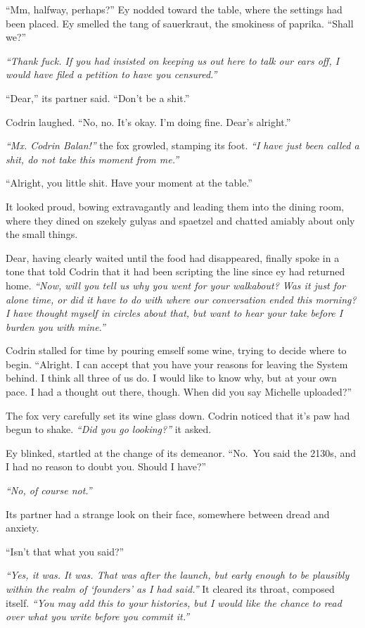 ``Mm, halfway, perhaps?'' Ey nodded toward the table, where the settings had been placed. Ey smelled the tang of sauerkraut, the smokiness of paprika. ``Shall we?''

\emph{``Thank fuck. If you had insisted on keeping us out here to talk our ears off, I would have filed a petition to have you censured.''}

``Dear,'' its partner said. ``Don't be a shit.''

Codrin laughed. ``No, no. It's okay. I'm doing fine. Dear's alright.''

\emph{``Mx. Codrin Balan!''} the fox growled, stamping its foot. \emph{``I have just been called a shit, do not take this moment from me.''}

``Alright, you little shit. Have your moment at the table.''

It looked proud, bowing extravagantly and leading them into the dining room, where they dined on szekely gulyas and spaetzel and chatted amiably about only the small things.

Dear, having clearly waited until the food had disappeared, finally spoke in a tone that told Codrin that it had been scripting the line since ey had returned home. \emph{``Now, will you tell us why you went for your walkabout? Was it just for alone time, or did it have to do with where our conversation ended this morning? I have thought myself in circles about that, but want to hear your take before I burden you with mine.''}

Codrin stalled for time by pouring emself some wine, trying to decide where to begin. ``Alright. I can accept that you have your reasons for leaving the System behind. I think all three of us do. I would like to know why, but at your own pace. I had a thought out there, though. When did you say Michelle uploaded?''

The fox very carefully set its wine glass down. Codrin noticed that it's paw had begun to shake. \emph{``Did you go looking?''} it asked.

Ey blinked, startled at the change of its demeanor. ``No.~You said the 2130s, and I had no reason to doubt you. Should I have?''

\emph{``No, of course not.''}

Its partner had a strange look on their face, somewhere between dread and anxiety.

``Isn't that what you said?''

\emph{``Yes, it was. It was. That was after the launch, but early enough to be plausibly within the realm of `founders' as I had said.''} It cleared its throat, composed itself. \emph{``You may add this to your histories, but I would like the chance to read over what you write before you commit it.''}

